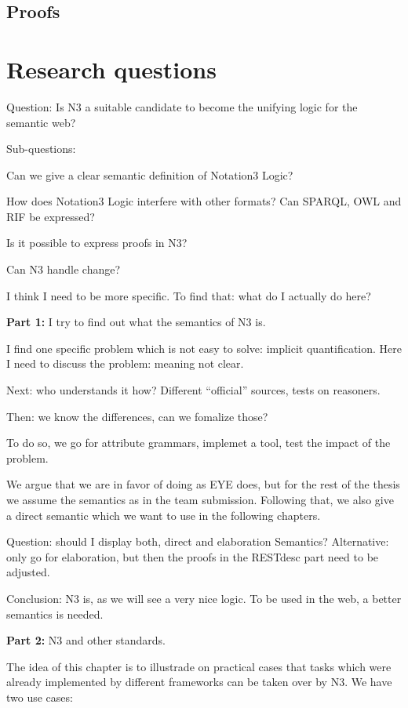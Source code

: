 \subsection{Proofs}
\section{Research questions}
Question: Is N3 a suitable candidate to become the unifying logic for the semantic web?

Sub-questions:

Can we give a clear semantic definition of Notation3 Logic?

How does Notation3 Logic interfere with other formats? Can SPARQL, OWL and RIF be expressed?

Is it possible to express proofs in N3?

Can N3 handle change?

I think I need to be more specific. To find that: what do I actually do here?

\textbf{Part 1:}
I try to find out what the semantics of N3 is. 

I find one specific problem which is not easy to solve: implicit quantification. Here I need to discuss the problem: meaning not clear.

Next: who understands it how? Different ``official'' sources, tests on reasoners.


Then: we know the differences, can we fomalize those?

To do so, we go for attribute grammars, implemet a tool, test the impact of the problem.

We argue that we are in favor of doing as EYE does, but for the rest of the thesis we assume the semantics as in the team submission. Following that, we also give a direct semantic which we want 
to use in the following chapters.

Question: should I display both, direct and elaboration Semantics? Alternative: only go for elaboration, but then the proofs in the RESTdesc part need to be adjusted.

Conclusion: N3 is, as we will see a very nice logic. To be used in the web, a better semantics is needed. 

\textbf{Part 2:}
N3 and other standards.

The idea of this chapter is to illustrade on practical cases that tasks which were already implemented by different frameworks can be taken over by N3. We have two use cases: 

